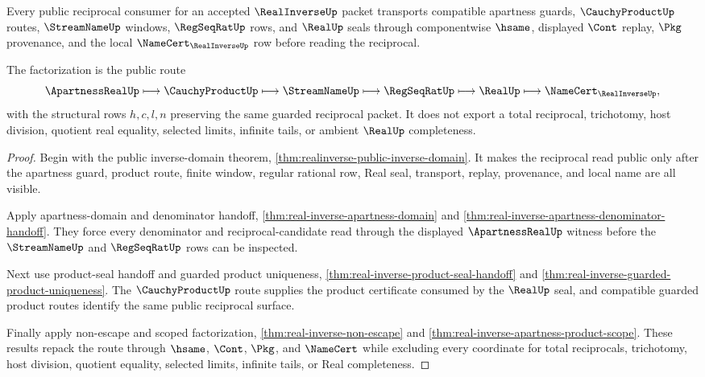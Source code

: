 \begin{theorem}
\label{thm:real-inverse-public-transport-consumer-factorization}
Every public reciprocal consumer for an accepted $\RealInverseUp$ packet transports compatible apartness guards, $\CauchyProductUp$ routes, $\StreamNameUp$ windows, $\RegSeqRatUp$ rows, and $\RealUp$ seals through componentwise $\hsame$, displayed $\Cont$ replay, $\Pkg$ provenance, and the local $\NameCert_{\RealInverseUp}$ row before reading the reciprocal.

The factorization is the public route
$$
\ApartnessRealUp \longmapsto \CauchyProductUp \longmapsto
\StreamNameUp \longmapsto \RegSeqRatUp \longmapsto \RealUp
\longmapsto \NameCert_{\RealInverseUp},
$$
with the structural rows $h,c,l,n$ preserving the same guarded reciprocal packet. It does not export a total reciprocal, trichotomy, host division, quotient real equality, selected limits, infinite tails, or ambient $\RealUp$ completeness.
\end{theorem}
\begin{proof}
Begin with the public inverse-domain theorem, \autoref{thm:realinverse-public-inverse-domain}. It makes the reciprocal read public only after the apartness guard, product route, finite window, regular rational row, Real seal, transport, replay, provenance, and local name are all visible.

Apply apartness-domain and denominator handoff, \autoref{thm:real-inverse-apartness-domain} and \autoref{thm:real-inverse-apartness-denominator-handoff}. They force every denominator and reciprocal-candidate read through the displayed $\ApartnessRealUp$ witness before the $\StreamNameUp$ and $\RegSeqRatUp$ rows can be inspected.

Next use product-seal handoff and guarded product uniqueness, \autoref{thm:real-inverse-product-seal-handoff} and \autoref{thm:real-inverse-guarded-product-uniqueness}. The $\CauchyProductUp$ route supplies the product certificate consumed by the $\RealUp$ seal, and compatible guarded product routes identify the same public reciprocal surface.

Finally apply non-escape and scoped factorization, \autoref{thm:real-inverse-non-escape} and \autoref{thm:real-inverse-apartness-product-scope}. These results repack the route through $\hsame$, $\Cont$, $\Pkg$, and $\NameCert$ while excluding every coordinate for total reciprocals, trichotomy, host division, quotient equality, selected limits, infinite tails, or Real completeness.
\end{proof}

